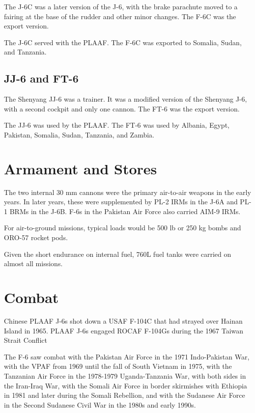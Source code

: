 The J-6C was a later version of the J-6, with the brake parachute moved to a fairing at the base of the rudder and other minor changes. The F-6C was the export version.

The J-6C served with the PLAAF. The F-6C was exported to Somalia, Sudan, and Tanzania.

\subsection{JJ-6 and FT-6}

The Shenyang JJ-6 was a trainer. It was a modified version of the Shenyang J-6, with a second cockpit and only one cannon. The FT-6 was the export version.

The JJ-6 was used by the PLAAF. The FT-6 was used by Albania, Egypt, Pakistan, Somalia, Sudan, Tanzania, and Zambia.

\section{Armament and Stores}

The two internal 30 mm cannons were the primary air-to-air weapons in the early years. In later years, these were supplemented by PL-2 IRMs in the J-6A and PL-1 BRMs in the J-6B. F-6s in the Pakistan Air Force also carried AIM-9 IRMs.

For air-to-ground missions, typical loads would be 500 lb or 250 kg bombs and ORO-57 rocket pods.

Given the short endurance on internal fuel, 760L fuel tanks were carried on almost all missions.

\section{Combat}

Chinese PLAAF J-6s shot down a USAF F-104C that had strayed over Hainan Island in 1965. PLAAF J-6s engaged ROCAF F-104Gs during the 1967 Taiwan Strait Conflict

The F-6 saw combat with the Pakistan Air Force in the 1971 Indo-Pakistan War, with the VPAF from 1969 until the fall of South Vietnam in 1975, with the Tanzanian Air Force in the 1978-1979 Uganda-Tanzania War, with both sides in the Iran-Iraq War, with the Somali Air Force in border skirmishes with Ethiopia in 1981 and later during the Somali Rebellion, and with the Sudanese Air Force in the Second Sudanese Civil War in the 1980s and early 1990s.

